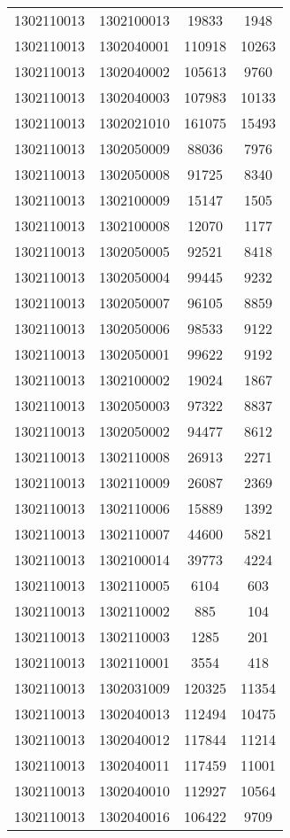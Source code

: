\begin{longtable}{llcc}
1302110013 & 1302100013 & 19833 & 1948\\
1302110013 & 1302040001 & 110918 & 10263\\
1302110013 & 1302040002 & 105613 & 9760\\
1302110013 & 1302040003 & 107983 & 10133\\
1302110013 & 1302021010 & 161075 & 15493\\
1302110013 & 1302050009 & 88036 & 7976\\
1302110013 & 1302050008 & 91725 & 8340\\
1302110013 & 1302100009 & 15147 & 1505\\
1302110013 & 1302100008 & 12070 & 1177\\
1302110013 & 1302050005 & 92521 & 8418\\
1302110013 & 1302050004 & 99445 & 9232\\
1302110013 & 1302050007 & 96105 & 8859\\
1302110013 & 1302050006 & 98533 & 9122\\
1302110013 & 1302050001 & 99622 & 9192\\
1302110013 & 1302100002 & 19024 & 1867\\
1302110013 & 1302050003 & 97322 & 8837\\
1302110013 & 1302050002 & 94477 & 8612\\
1302110013 & 1302110008 & 26913 & 2271\\
1302110013 & 1302110009 & 26087 & 2369\\
1302110013 & 1302110006 & 15889 & 1392\\
1302110013 & 1302110007 & 44600 & 5821\\
1302110013 & 1302100014 & 39773 & 4224\\
1302110013 & 1302110005 & 6104 & 603\\
1302110013 & 1302110002 & 885 & 104\\
1302110013 & 1302110003 & 1285 & 201\\
1302110013 & 1302110001 & 3554 & 418\\
1302110013 & 1302031009 & 120325 & 11354\\
1302110013 & 1302040013 & 112494 & 10475\\
1302110013 & 1302040012 & 117844 & 11214\\
1302110013 & 1302040011 & 117459 & 11001\\
1302110013 & 1302040010 & 112927 & 10564\\
1302110013 & 1302040016 & 106422 & 9709\\

\end{longtable}
